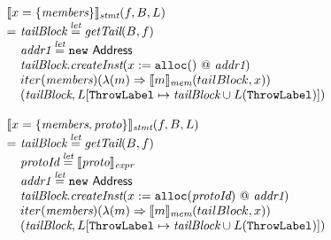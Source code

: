 \vspace*{-2em}
\[
\begin{array}{l@{}l@{~}l}
\lefteqn{\transfun{\irobject{x}{\emph{members}}}_{\emph{stmt}}(f, B, L)}\\
& = & \emph{tailBlock} \letval \getTail(B, f)\\
& & \emph{addr1} \letval \new\ \Address\\
& & \emph{tailBlock}.\emph{createInst}(x := \TT{alloc}() ~@~ \emph{addr1})\\
& & iter(\emph{members})(\lambda(m) \Rightarrow \transfun{m}_{\emph{mem}}(tailBlock, x))\\
& & (\emph{tailBlock}, L[\ThrowLabel \mapsto \emph{tailBlock} \cup L(\ThrowLabel)])\\
& & \\

\lefteqn{\transfun{\irobject{x}{\emph{members}, \emph{proto}}}_{\emph{stmt}}(f, B, L)}\\
& = & \emph{tailBlock} \letval \getTail(B, f)\\
& & \emph{protoId} \letval \transfun{\emph{proto}}_{\emph{expr}}\\
& & \emph{addr1} \letval \new\ \Address\\
& & \emph{tailBlock}.\emph{createInst}(x := \TT{alloc}(\emph{protoId}) ~@~ \emph{addr1})\\
& & iter(\emph{members})(\lambda(m) \Rightarrow \transfun{m}_{\emph{mem}}(tailBlock, x))\\
& & (\emph{tailBlock}, L[\ThrowLabel \mapsto \emph{tailBlock} \cup L(\ThrowLabel)])\\
& & \\


\end{array}\]
